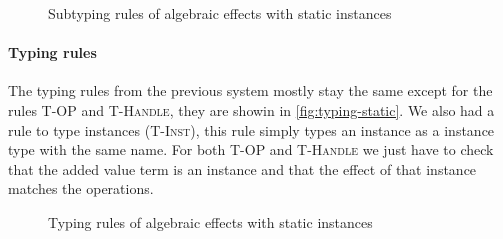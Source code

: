 {\begin{figure}
\caption{Subtyping rules of algebraic effects with static instances}
\centering
{}
\end{figure}

\paragraph{Typing rules}
The typing rules from the previous system mostly stay the same except for the rules \textsc{T-OP} and \textsc{T-Handle}, they are showin in \cref{fig:typing-static}.
We also had a rule to type instances (\textsc{T-Inst}), this rule simply types an instance as a instance type with the same name.
For both \textsc{T-OP} and \textsc{T-Handle} we just have to check that the added value term is an instance and that the effect of that instance matches the operations.

\begin{figure}
\caption{Typing rules of algebraic effects with static instances}
\centering
{}
\end{figure}

}
